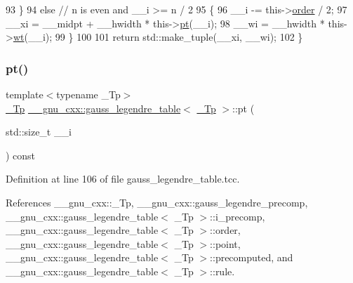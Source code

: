 \begin{DoxyCode}
93         \}
94       \textcolor{keywordflow}{else} \textcolor{comment}{// n is even and \_\_i >= n / 2}
95         \{
96           \_\_i  -= this->\hyperlink{struct____gnu__cxx_1_1gauss__legendre__table_aecdc9cdb90f5a7b4f06a455cd868370f}{order} / 2;
97           \_\_xi = \_\_midpt + \_\_hwidth * this->\hyperlink{struct____gnu__cxx_1_1gauss__legendre__table_a22c34439f95a9cd22e95e37442127f63}{pt}(\_\_i);
98           \_\_wi =           \_\_hwidth * this->\hyperlink{struct____gnu__cxx_1_1gauss__legendre__table_affd960260dce4c36ad22f9c34b411bc7}{wt}(\_\_i);
99         \}
100 
101       \textcolor{keywordflow}{return} std::make\_tuple(\_\_xi, \_\_wi);
102     \}
\end{DoxyCode}
\mbox{\label{struct____gnu__cxx_1_1gauss__legendre__table_a22c34439f95a9cd22e95e37442127f63}} 
\subsubsection{\texorpdfstring{pt()}{pt()}}
{\footnotesize\ttfamily template$<$typename \+\_\+\+Tp$>$ \\
\hyperlink{namespace____gnu__cxx_a3b19a9c800ca194374ef9172290f7d79}{\+\_\+\+Tp} \hyperlink{struct____gnu__cxx_1_1gauss__legendre__table}{\+\_\+\+\_\+gnu\+\_\+cxx\+::gauss\+\_\+legendre\+\_\+table}$<$ \hyperlink{namespace____gnu__cxx_a3b19a9c800ca194374ef9172290f7d79}{\+\_\+\+Tp} $>$\+::pt (\begin{DoxyParamCaption}\item[{std\+::size\+\_\+t}]{\+\_\+\+\_\+i }\end{DoxyParamCaption}) const}



Definition at line 106 of file gauss\+\_\+legendre\+\_\+table.\+tcc.



References \+\_\+\+\_\+gnu\+\_\+cxx\+::\+\_\+\+Tp, \+\_\+\+\_\+gnu\+\_\+cxx\+::gauss\+\_\+legendre\+\_\+precomp, \+\_\+\+\_\+gnu\+\_\+cxx\+::gauss\+\_\+legendre\+\_\+table$<$ \+\_\+\+Tp $>$\+::i\+\_\+precomp, \+\_\+\+\_\+gnu\+\_\+cxx\+::gauss\+\_\+legendre\+\_\+table$<$ \+\_\+\+Tp $>$\+::order, \+\_\+\+\_\+gnu\+\_\+cxx\+::gauss\+\_\+legendre\+\_\+table$<$ \+\_\+\+Tp $>$\+::point, \+\_\+\+\_\+gnu\+\_\+cxx\+::gauss\+\_\+legendre\+\_\+table$<$ \+\_\+\+Tp $>$\+::precomputed, and \+\_\+\+\_\+gnu\+\_\+cxx\+::gauss\+\_\+legendre\+\_\+table$<$ \+\_\+\+Tp $>$\+::rule.




